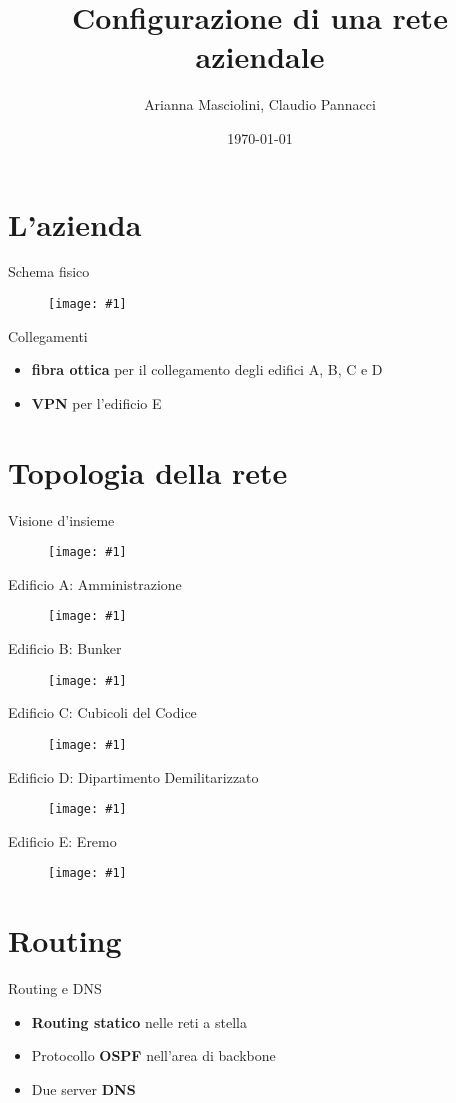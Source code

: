 \documentclass{beamer}
\title{Configurazione di una rete aziendale}
\date{\today}
\author{Arianna Masciolini, Claudio Pannacci}
\institute{Università degli Studi di Perugia}
\def\image[#1][#2]{
  \begin{figure}[H]
  \centering
  \texttt{[image: \#1]}
  \end{figure}}
\begin{document}
  \maketitle
  \section{L'azienda}
  	\begin{frame}{Schema fisico}
    	\image[schema_fisico.png][scale=0.30]
  	\end{frame}
  	\begin{frame}{Collegamenti}
  		\begin{itemize}
  			\item \textbf{fibra ottica} per il collegamento degli edifici A, B, C e D
  			\item \textbf{VPN} per l'edificio E
  		\end{itemize}
  	\end{frame}
  \section{Topologia della rete}
  	\begin{frame}{Visione d'insieme}
  		\image[schema_logico.png][scale=0.25]
  	\end{frame}
  	\begin{frame}{Edificio A: Amministrazione}
  		\image[ed_a.png][scale=0.50]
  	\end{frame}
  	\begin{frame}{Edificio B: Bunker}
  		\image[ed_b.png][scale=0.50]
  	\end{frame}
  	\begin{frame}{Edificio C: Cubicoli del Codice}
  		\image[ed_c.png][scale=0.50]
  	\end{frame}
  	\begin{frame}{Edificio D: Dipartimento Demilitarizzato}
  		\image[ed_d.png][scale=0.50]
  	\end{frame}
  	\begin{frame}{Edificio E: Eremo}
  		\image[ed_e.png][scale=0.50]
  	\end{frame}
  \section{Routing}
  	\begin{frame}{Routing e DNS}
  		\begin{itemize}
  			\item \textbf{Routing statico} nelle reti a stella
  			\item Protocollo \textbf{OSPF} nell'area di  backbone
  			\item Due server \textbf{DNS}
  		\end{itemize}
  	\end{frame}
\end{document}
